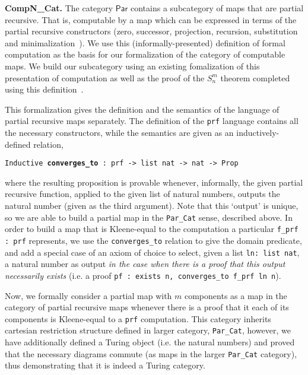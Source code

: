 \documentclass{entcs} \usepackage{entcsmacro}
\begin{document}
{\bfseries CompN\_Cat.} The category $\mathsf{Par}$ contains a subcategory of maps that are partial recursive. That is, computable by a map which can be expressed in terms of the partial recursive constructors (zero, successor, projection, recursion, substitution and minimalization~\cite{Computability}). We use this (informally-presented) definition of formal computation as the basis for our formalization of the category of computable maps. We build our subcategory using an existing fomalization of this presentation of computation as well as the proof of the $S^m_n$ theorem completed using this definition~\cite{SmnForm}.

This formalization gives the definition and the semantics of the language of partial recursive maps separately. The definition of the {\tt \small prf} language contains all the necessary constructors, while the semantics are given as an inductively-defined relation, 

{\tt \scriptsize Inductive {\bfseries converges\_to} : prf -> list nat -> nat -> Prop} 

\noindent where the resulting proposition is provable whenever, informally, the given partial recursive function, applied to the given list of natural numbers, outputs the natural number (given as the third argument). Note that this `output' is unique, so we are able to build a partial map in the {\tt \small Par\_Cat} sense, described above. In order to build a map that is Kleene-equal to the computation a particular {\tt \small f\_prf : prf} represents, we use the {\tt \small converges\_to} relation to give the domain predicate, and add a special case of an axiom of choice to select, given a list {\tt \small ln: list nat}, a natural number as output \textit{in the case when there is a proof that this output necessarily exists} (i.e. a proof {\tt \small pf : exists n, converges\_to f\_prf ln n}). 

Now, we formally consider a partial map with $m$ components as a map in the category of partial recursive maps whenever there is a proof that it each of its components is Kleene-equal to a {\tt \small prf} computation. This category inherits cartesian restriction structure defined in larger category, {\tt \small Par\_Cat}, however, we have additionally defined a Turing object (i.e. the natural numbers) and proved that the necessary diagrams commute (as maps in the larger {\tt \small Par\_Cat} category), thus demonstrating that it is indeed a Turing category.
\end{document}
